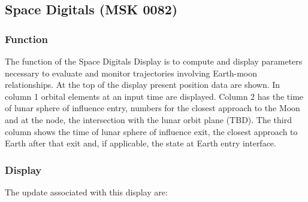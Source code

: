 \documentclass[11pt]{article} %
\begin{document}
\subsection{Space Digitals (MSK 0082)}

\subsubsection{Function}

The function of the Space Digitals Display is to compute and display parameters necessary to evaluate and monitor trajectories involving Earth-moon relationships. At the top of the display present position data are shown. In column 1 orbital elements at an input time are displayed. Column 2 has the time of lunar sphere of influence entry, numbers for the closest approach to the Moon and at the node, the intersection with the lunar orbit plane (TBD). The third column shows the time of lunar sphere of influence exit, the closest approach to Earth after that exit and, if applicable, the state at Earth entry interface.

\subsubsection{Display}

The update associated with this display are:\\
\end{document}
